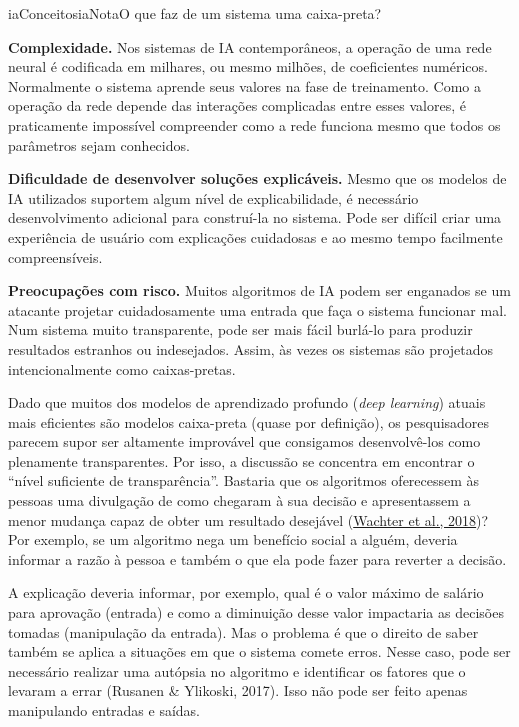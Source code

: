 \documentclass[
  11pt,
]{article}
\newenvironment{nota}[1][Nota]{\begin{iabox}{iaConceitos}{iaNota}{#1}}{\end{iabox}}
\begin{document}
\begin{nota}[O que faz de um sistema uma caixa-preta?]

\textbf{Complexidade.} Nos sistemas de IA contemporâneos, a operação de
uma rede neural é codificada em milhares, ou mesmo milhões, de
coeficientes numéricos. Normalmente o sistema aprende seus valores na
fase de treinamento. Como a operação da rede depende das interações
complicadas entre esses valores, é praticamente impossível compreender
como a rede funciona mesmo que todos os parâmetros sejam conhecidos.

\textbf{Dificuldade de desenvolver soluções explicáveis.} Mesmo que os
modelos de IA utilizados suportem algum nível de explicabilidade, é
necessário desenvolvimento adicional para construí-la no sistema. Pode
ser difícil criar uma experiência de usuário com explicações cuidadosas
e ao mesmo tempo facilmente compreensíveis.

\textbf{Preocupações com risco.} Muitos algoritmos de IA podem ser
enganados se um atacante projetar cuidadosamente uma entrada que faça o
sistema funcionar mal. Num sistema muito transparente, pode ser mais
fácil burlá-lo para produzir resultados estranhos ou indesejados. Assim,
às vezes os sistemas são projetados intencionalmente como caixas-pretas.

\end{nota}

Dado que muitos dos modelos de aprendizado profundo (\emph{deep
learning}) atuais mais eficientes são modelos caixa-preta (quase por
definição), os pesquisadores parecem supor ser altamente improvável que
consigamos desenvolvê-los como plenamente transparentes. Por isso, a
discussão se concentra em encontrar o ``nível suficiente de
transparência''. Bastaria que os algoritmos oferecessem às pessoas uma
divulgação de como chegaram à sua decisão e apresentassem a menor
mudança capaz de obter um resultado desejável
(\href{https://arxiv.org/pdf/1811.01439.pdf}{Wachter et al., 2018})? Por
exemplo, se um algoritmo nega um benefício social a alguém, deveria
informar a razão à pessoa e também o que ela pode fazer para reverter a
decisão.

A explicação deveria informar, por exemplo, qual é o valor máximo de
salário para aprovação (entrada) e como a diminuição desse valor
impactaria as decisões tomadas (manipulação da entrada). Mas o problema
é que o direito de saber também se aplica a situações em que o sistema
comete erros. Nesse caso, pode ser necessário realizar uma autópsia no
algoritmo e identificar os fatores que o levaram a errar (Rusanen \&
Ylikoski, 2017). Isso não pode ser feito apenas manipulando entradas e
saídas.
\end{document}
